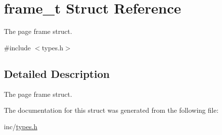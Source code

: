 \hypertarget{structframe__t}{
\section{frame\_\-t Struct Reference}
\label{structframe__t}
}


The page frame struct.  




{\ttfamily \#include $<$types.h$>$}



\subsection{Detailed Description}
The page frame struct. 

The documentation for this struct was generated from the following file:\begin{DoxyCompactItemize}
\item 
inc/\hyperlink{types_8h}{types.h}\end{DoxyCompactItemize}
